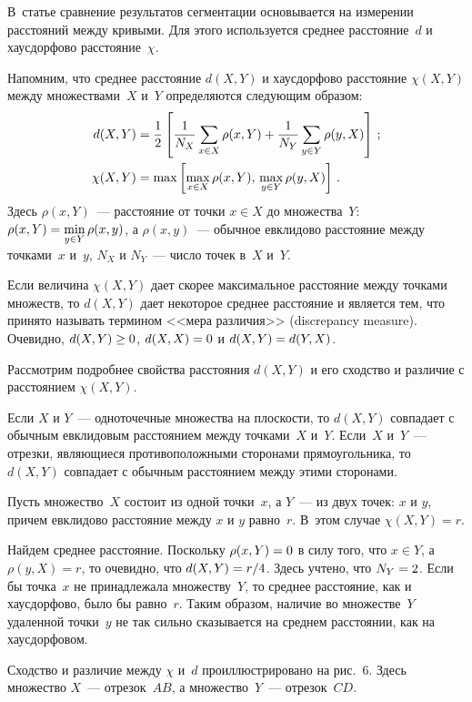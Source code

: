\begin{multicols}{2}
  В~статье сравнение результатов сегментации основывается на измерении 
расстояний между кривыми. Для этого используется среднее расстояние~$d$ и 
хаусдорфово расстояние~$\chi$.
  
  Напомним, что среднее расстояние $d(X, Y)$ и хаусдорфово расстояние 
$\chi(X, Y)$ между множествами~$X$ и~$Y$ определяются следующим 
образом:
  \begin{align*}
  d(X,Y) &=\displaystyle\frac{\displaystyle 1\mathstrut}{\displaystyle 2\mathstrut}\left[ 
\displaystyle\frac{\displaystyle 1\mathstrut}{\displaystyle N_X\mathstrut}\sum\limits_{x\in X}\rho(x,Y)+\displaystyle\frac{\displaystyle 1\mathstrut}{\displaystyle N_Y\mathstrut}\sum\limits_{y\in 
Y}\rho(y,X)\right]\,;\\
  \chi(X,Y) &= \max\left[\max\limits_{x\in X} 
\rho(x,Y),\,\max\limits_{y\in Y}\rho(y,X)\right]\,.
  \end{align*}
    Здесь $\rho(x, Y)$~--- расстояние от точки $x\in X$ до множества~$Y$: 
$\rho(x,Y)\hm=\min\limits_{y\in Y}\rho(x,y)$, а $\rho(x,y)$~--- обычное 
  евклидово расстояние между точками~$x$ и~$y$, $N_X$ и $N_Y$~--- чис\-ло 
точек в~$X$ и~$Y$.
  
  Если величина $\chi(X, Y)$ дает скорее максимальное расстояние между 
точками множеств, то $d(X, Y)$ дает некоторое среднее расстояние и является 
тем, что принято называть термином <<мера различия>> (discrepancy 
measure). Очевидно, $d(X, Y) \hm\geq 0$, $d(X, X) \hm=0$ и $d(X, Y) \hm= d(Y, 
X)$.
  
  Рассмотрим подробнее свойства расстояния $d(X, Y)$ и его сходство и 
различие с расстоянием $\chi(X, Y)$.
  
  Если $X$ и $Y$~--- одноточечные множества на плоскости, то $d(X, Y)$ 
совпадает с обычным евклидовым расстоянием между точками~$X$ и~$Y$. 
Если~$X$ и~$Y$~--- отрезки, являющиеся противоположными сторонами 
прямоугольника, то $d(X, Y)$ совпадает с обычным расстоянием между этими 
сторонами.
  
  Пусть множество~$X$ состоит из одной точки~$x$, а $Y$~--- из двух точек: 
$x$ и $y$, причем евклидово расстояние между $x$ и $y$ равно~$r$. В~этом 
случае $\chi(X, Y) = r$.
  
  Найдем среднее расстояние. Поскольку $\rho(x, Y) \hm= 0$ в силу того, что $x\in 
Y$, а $\rho(y, X) = r$, то очевидно, что $d(X, Y) \hm= r/4$. Здесь учтено, что $N_Y \hm= 
2$. Если бы точка~$x$ не принадлежала множеству~$Y$, то среднее 
расстояние, как и хаусдорфово, было бы равно~$r$. Таким образом, наличие во 
множестве~$Y$ удаленной точки~$y$ не так сильно сказывается на среднем 
расстоянии, как на хаусдорфовом.
  
  Сходство и различие между $\chi$ и~$d$ проиллюстрировано на рис.~6. 
Здесь множество $X$~--- отрезок~$AB$, а множество~$Y$~--- отрезок~$CD$.


\end{multicols}
